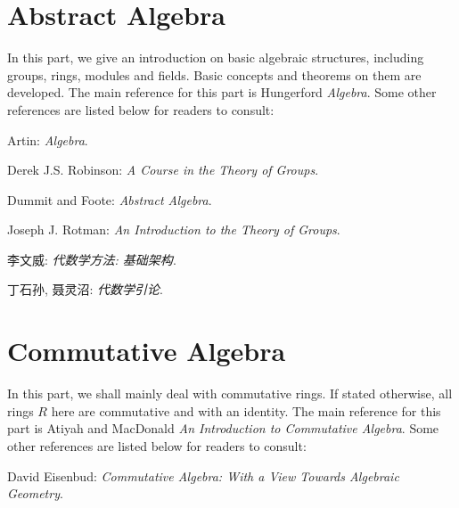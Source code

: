 \documentclass{article}
\begin{document}
\part{Abstract Algebra}
In this part, we give an introduction on basic algebraic structures, including groups, rings, modules and fields. Basic concepts and theorems on them are developed. The main reference for this part is Hungerford \textit{Algebra}. Some other references are listed below for readers to consult: \par
[1] Artin: \textit{Algebra}.\par
[2] Derek J.S. Robinson: \textit{A Course in the Theory of Groups}.\par
[3] Dummit and Foote: \textit{Abstract Algebra}.\par
[4] Joseph J. Rotman: \textit{An Introduction to the Theory of Groups}.\par
[5] 李文威: \textit{代数学方法: 基础架构}.\par
[6] 丁石孙, 聂灵沼: \textit{代数学引论}.
\newpage

\newpage

\newpage

\newpage

\newpage

\newpage

\newpage
\part{Commutative Algebra}
In this part, we shall mainly deal with commutative rings. If stated otherwise, all rings $R$ here are commutative and with an identity. The main reference for this part is Atiyah and MacDonald \textit{An Introduction to Commutative Algebra}. Some other  references are listed below for readers to consult: \par
[1] David Eisenbud: \textit{Commutative Algebra: With a View Towards Algebraic Geometry}.
\newpage

\newpage

\end{document}
